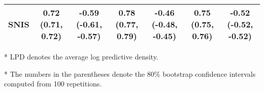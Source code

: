 \begin{table*}
\begin{threeparttable}
\begin{tabular}{lcccccc}
    SNIS & 0.72 {\scriptsize(0.71, 0.72)} & -0.59 {\scriptsize(-0.61, -0.57)} & 0.78 {\scriptsize(0.77, 0.79)} & -0.46 {\scriptsize(-0.48, -0.45)} & 0.75 {\scriptsize(0.75, 0.76)} & -0.52 {\scriptsize(-0.52, -0.52)} \\\bottomrule
  \end{tabular}
  \begin{tablenotes}
    \item[*]{\footnotesize LPD denotes the average log predictive density.}
    \item[*]{\footnotesize The numbers in the parentheses denote the 80\% bootstrap confidence intervals computed from 100 repetitions.}
  \end{tablenotes}
  \end{threeparttable}
  \vspace{-0.15in}
\end{table*}

